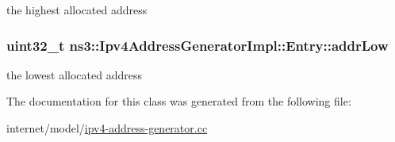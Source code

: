 the highest allocated address 

\subsubsection[{\texorpdfstring{addr\+Low}{addrLow}}]{\setlength{\rightskip}{0pt plus 5cm}uint32\+\_\+t ns3\+::\+Ipv4\+Address\+Generator\+Impl\+::\+Entry\+::addr\+Low}\hypertarget{classns3_1_1Ipv4AddressGeneratorImpl_1_1Entry_ad487bc977854de4205bee87a2caafdd7}{}\label{classns3_1_1Ipv4AddressGeneratorImpl_1_1Entry_ad487bc977854de4205bee87a2caafdd7}


the lowest allocated address 



The documentation for this class was generated from the following file\+:\begin{DoxyCompactItemize}
\item 
internet/model/\hyperlink{ipv4-address-generator_8cc}{ipv4-\/address-\/generator.\+cc}\end{DoxyCompactItemize}
